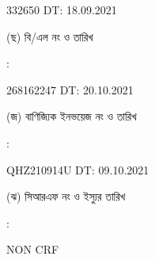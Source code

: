 \documentclass[12pt]{article}
\newcommand{\blno}{268162247}
\newcommand{\bldt}{20.10.2021}
\newcommand{\lcano}{332650}
\newcommand{\lcadt}{18.09.2021}
\newcommand{\invno}{QHZ210914U}
\newcommand{\invdt}{09.10.2021}
\newcommand{\crf}{NON CRF}
\newcommand{\crfdt}{}
\begin{document}
\begin{minipage}[t]{0.50\linewidth}
{\lcano} \hspace{2em} DT: {\lcadt}
\\
\end{minipage}
\begin{minipage}[t]{0.05\linewidth}
\hspace*{1em}
\end{minipage}
\begin{minipage}[t]{0.45\linewidth}
(ছ) বি/এল নং ও তারিখ
\end{minipage}
\begin{minipage}[t]{0.02\linewidth}
:
\end{minipage}
\begin{minipage}[t]{0.50\linewidth}
{\blno} \hspace{2em} DT: {\bldt}
\\
\end{minipage}
\begin{minipage}[t]{0.05\linewidth}
\hspace*{1em}
\end{minipage}
\begin{minipage}[t]{0.45\linewidth}
(জ) বাণিজ্যিক ইনভয়েজ নং ও তারিখ
\end{minipage}
\begin{minipage}[t]{0.02\linewidth}
:
\end{minipage}
\begin{minipage}[t]{0.50\linewidth}
{\invno} \hspace{2em} DT: {\invdt}
\\
\end{minipage}
\begin{minipage}[t]{0.05\linewidth}
\hspace*{1em}
\end{minipage}
\begin{minipage}[t]{0.45\linewidth}
(ঝ) সিআরএফ নং ও ইস্যুর তারিখ
\end{minipage}
\begin{minipage}[t]{0.02\linewidth}
:
\end{minipage}
\begin{minipage}[t]{0.50\linewidth}
{\crf} \hspace{2em} {\crfdt}
\\
\end{minipage}
\begin{minipage}[t]{0.05\linewidth}
\hspace*{1em}
\end{minipage}
\end{document}
